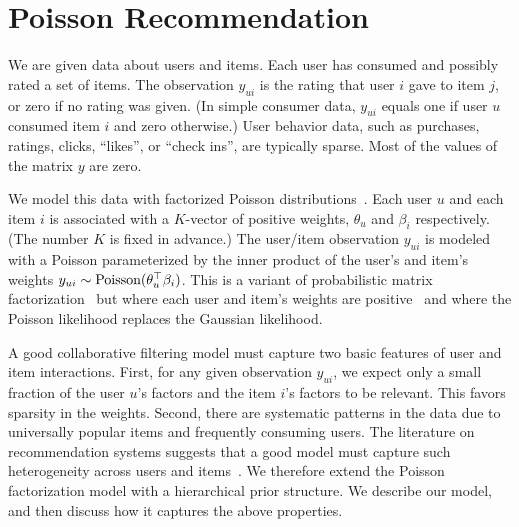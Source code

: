 \section{Poisson Recommendation}
\label{sec:model}


We are given data about users and items.  Each user has consumed and
possibly rated a set of items.  The observation $y_{ui}$ is the rating
that user $i$ gave to item $j$, or zero if no rating was given.  (In
simple consumer data, $y_{ui}$ equals one if user $u$ consumed item
$i$ and zero otherwise.)  User behavior data, such as purchases,
ratings, clicks, ``likes'', or ``check ins'', are typically sparse.
Most of the values of the matrix $y$ are zero.

We model this data with factorized Poisson
distributions~\cite{Canny:2004}. Each user $u$ and each item $i$ is
associated with a $K$-vector of positive weights, $\theta_u$ and
$\beta_i$ respectively.  (The number $K$ is fixed in advance.)  The
user/item observation $y_{ui}$ is modeled with a Poisson parameterized
by the inner product of the user's and item's weights $y_{ui} \sim
\textrm{Poisson}(\theta_u^\top \beta_i)$.  This is a variant of probabilistic
matrix factorization~\cite{Salakhutdinov:2008a} but where each user
and item's weights are positive~\cite{Lee:1999} and where the Poisson
likelihood replaces the Gaussian likelihood.

A good collaborative filtering model must capture two basic features
of user and item interactions. First, for any given observation
$y_{ui}$, we expect only a small fraction of the user $u$'s factors
and the item $i$'s factors to be relevant. This favors sparsity in the
weights. Second, there are systematic patterns in the data due to
universally popular items and frequently consuming users. The
literature on recommendation systems suggests that a good model must
capture such heterogeneity across users and items~\cite{Koren:2009}. We
therefore extend the Poisson factorization model with a hierarchical
prior structure. We describe our model, and then discuss how it
captures the above properties.


